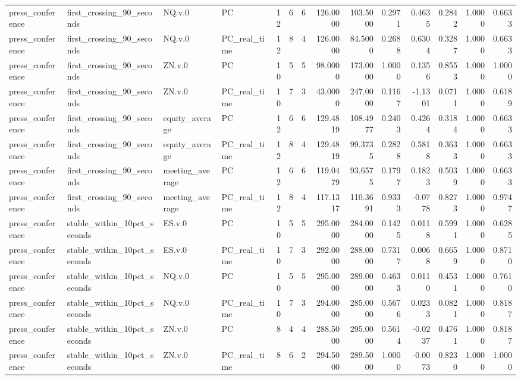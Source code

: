 \begin{tabular}{llllrrrrrrrrrr}
press_conference & first_crossing_90_seconds & NQ.v.0 & PC & 12 & 6 & 6 & 126.0000 & 103.5000 & 0.2971 & 0.4635 & 0.2842 & 1.0000 & 0.6633 \\
press_conference & first_crossing_90_seconds & NQ.v.0 & PC_real_time & 12 & 8 & 4 & 126.0000 & 84.5000 & 0.2688 & 0.6304 & 0.3287 & 1.0000 & 0.6633 \\
press_conference & first_crossing_90_seconds & ZN.v.0 & PC & 10 & 5 & 5 & 98.0000 & 173.0000 & 1.0000 & 0.1356 & 0.8553 & 1.0000 & 1.0000 \\
press_conference & first_crossing_90_seconds & ZN.v.0 & PC_real_time & 10 & 7 & 3 & 43.0000 & 247.0000 & 0.1167 & -1.1301 & 0.0711 & 1.0000 & 0.6189 \\
press_conference & first_crossing_90_seconds & equity_average & PC & 12 & 6 & 6 & 129.4819 & 108.4977 & 0.2403 & 0.4264 & 0.3184 & 1.0000 & 0.6633 \\
press_conference & first_crossing_90_seconds & equity_average & PC_real_time & 12 & 8 & 4 & 129.4819 & 99.3735 & 0.2828 & 0.5818 & 0.3633 & 1.0000 & 0.6633 \\
press_conference & first_crossing_90_seconds & meeting_average & PC & 12 & 6 & 6 & 119.0479 & 93.6575 & 0.1797 & 0.1823 & 0.5039 & 1.0000 & 0.6633 \\
press_conference & first_crossing_90_seconds & meeting_average & PC_real_time & 12 & 8 & 4 & 117.1317 & 110.3691 & 0.9333 & -0.0778 & 0.8273 & 1.0000 & 0.9747 \\
press_conference & stable_within_10pct_seconds & ES.v.0 & PC & 10 & 5 & 5 & 295.0000 & 284.0000 & 0.1425 & 0.0118 & 0.5991 & 1.0000 & 0.6285 \\
press_conference & stable_within_10pct_seconds & ES.v.0 & PC_real_time & 10 & 7 & 3 & 292.0000 & 288.0000 & 0.7317 & 0.0068 & 0.6659 & 1.0000 & 0.8710 \\
press_conference & stable_within_10pct_seconds & NQ.v.0 & PC & 10 & 5 & 5 & 295.0000 & 289.0000 & 0.4633 & 0.0110 & 0.4531 & 1.0000 & 0.7610 \\
press_conference & stable_within_10pct_seconds & NQ.v.0 & PC_real_time & 10 & 7 & 3 & 294.0000 & 285.0000 & 0.5676 & 0.0233 & 0.0821 & 1.0000 & 0.8187 \\
press_conference & stable_within_10pct_seconds & ZN.v.0 & PC & 8 & 4 & 4 & 288.5000 & 295.0000 & 0.5614 & -0.0237 & 0.4761 & 1.0000 & 0.8187 \\
press_conference & stable_within_10pct_seconds & ZN.v.0 & PC_real_time & 8 & 6 & 2 & 294.5000 & 289.5000 & 1.0000 & -0.0073 & 0.8230 & 1.0000 & 1.0000 \\

\end{tabular}
